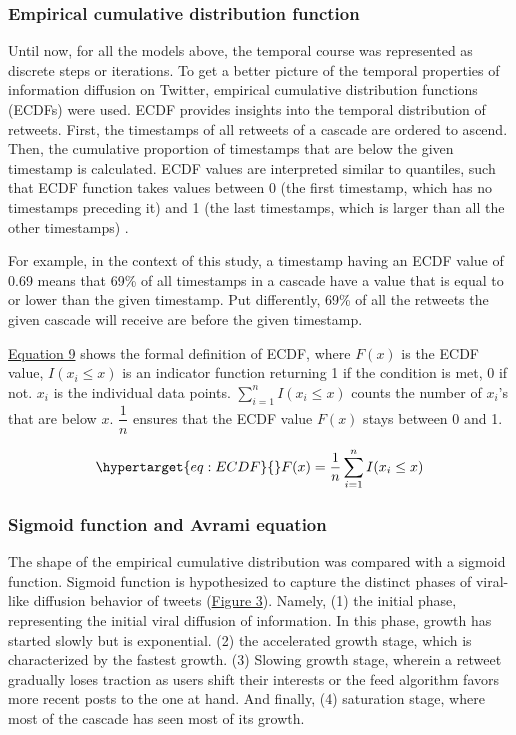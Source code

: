\documentclass[11pt,a4paper]{article}
\begin{document}
        \subsubsection{Empirical cumulative distribution function}
        Until now, for all the models above, the temporal course was represented as discrete steps or iterations. To get a better picture of the temporal properties of information diffusion on Twitter, empirical cumulative distribution functions (ECDFs) were used. ECDF provides insights into the temporal distribution of retweets. First, the timestamps of all retweets of a cascade are ordered to ascend. Then, the cumulative proportion of timestamps that are below the given timestamp is calculated. ECDF values are interpreted similar to quantiles, such that ECDF function takes values between 0 (the first timestamp, which has no timestamps preceding it) and 1 (the last timestamps, which is larger than all the other timestamps) \cite{conover_practical_1999}. 
        
        For example, in the context of this study, a timestamp having an ECDF value of 0.69 means that 69\% of all timestamps in a cascade have a value that is equal to or lower than the given timestamp. Put differently, 69\% of all the retweets the given cascade will receive are before the given timestamp. 
        
        \hyperlink{eq:ECDF}{Equation 9} shows the formal definition of ECDF, where $F(x)$ is the ECDF value, $I(x_i \leq x)$ is an indicator function returning 1 if the condition is met, 0 if not. $x_i$ is the individual data points. $\sum_{i=1}^{n} I(x_i \leq x)$ counts the number of $x_i$'s that are below $x$.  $\dfrac{1}{n}$ ensures that the ECDF value $F(x)$ stays between 0 and 1.

        \begin{equation}
            \hypertarget{eq:ECDF}{}
            F(x) = \frac{1}{n} \sum_{i=1}^{n} I(x_i \leq x)
        \end{equation}

        \subsubsection{Sigmoid function and Avrami equation}
        \hypertarget{sec:sigmoid}{}
        The shape of the empirical cumulative distribution was compared with a sigmoid function. Sigmoid function is hypothesized to capture the distinct phases of viral-like diffusion behavior of tweets (\hyperlink{fig:sigmoid}{Figure 3}). Namely, (1) the initial phase, representing the initial viral diffusion of information. In this phase, growth has started slowly but is exponential. (2) the accelerated growth stage, which is characterized by the fastest growth. (3) Slowing growth stage, wherein a retweet gradually loses traction as users shift their interests or the feed algorithm favors more recent posts to the one at hand. And finally, (4) saturation stage, where most of the cascade has seen most of its growth.
        
\end{document}

